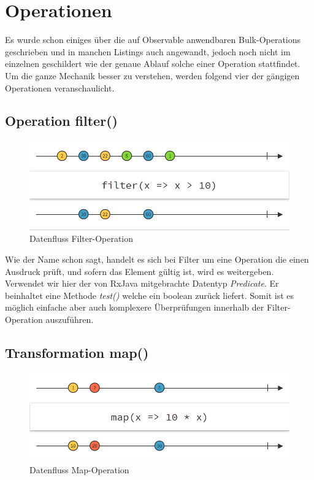 \section{Operationen}
Es wurde schon einiges über die auf Observable anwendbaren Bulk-Operations geschrieben und in manchen Listings auch angewandt, jedoch noch nicht im einzelnen geschildert wie der genaue Ablauf solche einer Operation stattfindet. Um die ganze Mechanik besser zu verstehen, werden folgend vier der gängigen Operationen veranschaulicht.
\subsection{Operation filter()}
\begin{figure}
	\centering
	\includegraphics[width=1\textwidth]{Abb/filter}
	\caption{Datenfluss Filter-Operation}
	\label{pic:filter}
\end{figure}
Wie der Name schon sagt, handelt es sich bei Filter um eine Operation die einen Ausdruck prüft, und sofern das Element gültig ist, wird es weitergeben. Verwendet wir hier der von RxJava mitgebrachte Datentyp \textit{Predicate}. Er beinhaltet eine Methode \textit{test()} welche ein boolean zurück liefert. Somit ist es möglich einfache aber auch komplexere Überprüfungen innerhalb der Filter-Operation auszuführen. 
\subsection{Transformation map()}
\begin{figure}
	\centering
	\includegraphics[width=1\textwidth]{Abb/map}
	\caption{Datenfluss Map-Operation}
	\label{pic:map}
\end{figure}
